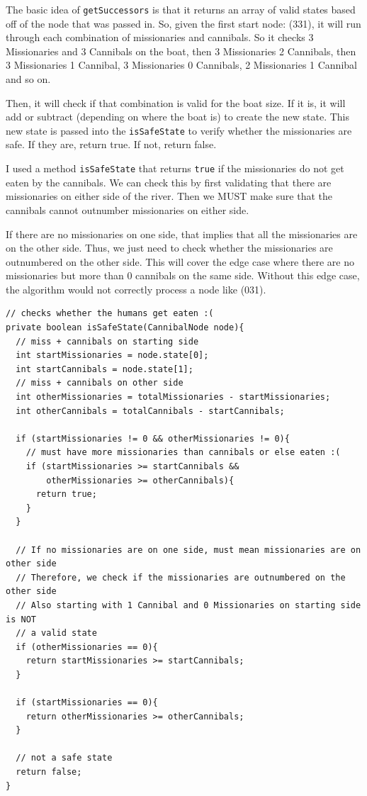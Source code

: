 \documentclass[a4paper]{report}
\begin{document}
The basic idea of \verb`getSuccessors` is that it returns an array of valid states
based off of the node that was passed in. So, given the first start node: (331), it will
run through each combination of missionaries and cannibals. So it checks 3 Missionaries and 
3 Cannibals on the boat, then 3 Missionaries 2 Cannibals, then 3 Missionaries 1 Cannibal, 
3 Missionaries 0 Cannibals, 2 Missionaries 1 Cannibal and so on. 

Then, it will check if 
that combination is valid for the boat size. If it is, it will add or subtract (depending
on where the boat is) to create the new state. This new state is passed into the \verb`isSafeState`
to verify whether the missionaries are safe. If they are, return true. If not, return false.

I used a method \verb`isSafeState` that returns \verb`true` if the missionaries do not get
eaten by the cannibals. We can check this by first validating that there are missionaries on
either side of the river. Then we MUST make sure that the cannibals cannot outnumber
missionaries on either side. 

If there are no missionaries on one side, that implies that all the missionaries are on the 
other side. Thus, we just need to check whether the missionaries are outnumbered on the other side. 
This will cover the edge case where there are no missionaries but more than 0 cannibals on the same side. 
Without this edge case, the algorithm would not correctly process a node like (031).

\begin{lstlisting}
// checks whether the humans get eaten :(
private boolean isSafeState(CannibalNode node){
  // miss + cannibals on starting side
  int startMissionaries = node.state[0];
  int startCannibals = node.state[1];
  // miss + cannibals on other side
  int otherMissionaries = totalMissionaries - startMissionaries;
  int otherCannibals = totalCannibals - startCannibals;
  
  if (startMissionaries != 0 && otherMissionaries != 0){
    // must have more missionaries than cannibals or else eaten :(
    if (startMissionaries >= startCannibals && 
        otherMissionaries >= otherCannibals){
      return true;
    }
  }
  
  // If no missionaries are on one side, must mean missionaries are on other side
  // Therefore, we check if the missionaries are outnumbered on the other side
  // Also starting with 1 Cannibal and 0 Missionaries on starting side is NOT 
  // a valid state
  if (otherMissionaries == 0){
    return startMissionaries >= startCannibals;
  }
  
  if (startMissionaries == 0){
    return otherMissionaries >= otherCannibals;
  }
  
  // not a safe state
  return false;
}

\end{lstlisting}
\end{document}
